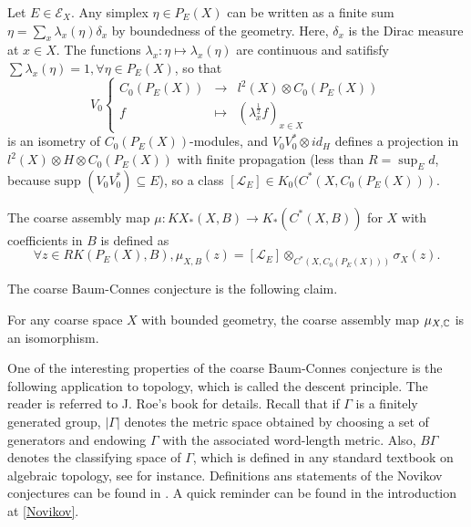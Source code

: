 Let $E\in \mathcal E_X$. Any simplex $\eta\in P_E(X)$ can be written as a finite sum $\eta=\sum_x \lambda_x(\eta)\delta_x$ by boundedness of the geometry. Here, $\delta_x$ is the Dirac measure at $x\in X$. The functions $\lambda_x :\eta\mapsto \lambda_x(\eta)$ are continuous and satifisfy $\sum\lambda_x(\eta) = 1,\forall\eta\in P_E(X)$, so that
\[\label{V0}\tag{1} V_0\left\{\begin{array}{rcl} 
 C_0(P_E(X)) & \rightarrow 	& l^2(X)\otimes C_0(P_E(X)) 		\\ 
 f           & \mapsto 		& (\lambda_x^{\frac{1}{2}}f)_{x\in X} 
\end{array}\right.\] 
is an isometry of $C_0(P_E(X))$-modules, and $V_0V_0^*\otimes id_H$ defines a projection in $l^2(X)\otimes H\otimes C_0(P_E(X))$ with finite propagation (less than $R= \sup_E d$, because $\text{supp }(V_0 V_0^*)\subseteq E$), so a class $[\mathcal L_E]\in K_0(C^*(X,C_0(P_E(X)))$.\\

\begin{definition}
The coarse assembly map $\mu:KX_*(X,B)\rightarrow K_*(C^*(X,B))$ for $X$ with coefficients in $B$ is defined as 
\[\forall z\in RK(P_E(X), B), \mu_{X,B}(z)=[\mathcal L_E]\otimes_{C^*(X,C_0(P_E(X)))} \sigma_X(z).\]
\end{definition}

The coarse Baum-Connes conjecture is the following claim.\\

\begin{conj}
For any coarse space $X$ with bounded geometry, the coarse assembly map $\mu_{X,\mathbb C}$ is an isomorphism.\\
\end{conj}


One of the interesting properties of the coarse Baum-Connes conjecture is the following application to topology, which is called the descent principle. The reader is referred to J. Roe's book \cite{RoeIndex} for details. Recall that if $\Gamma$ is a finitely generated group, $|\Gamma|$ denotes the metric space obtained by choosing a set of generators and endowing $\Gamma$ with the  associated word-length metric. Also, $B\Gamma$ denotes the classifying space of $\Gamma$, which is defined in any standard textbook on algebraic topology, see \cite{May} for instance. Definitions ans statements of the Novikov conjectures can be found in \cite{ferrynovikov}. A quick reminder can be found in the introduction at \ref{Novikov}.

